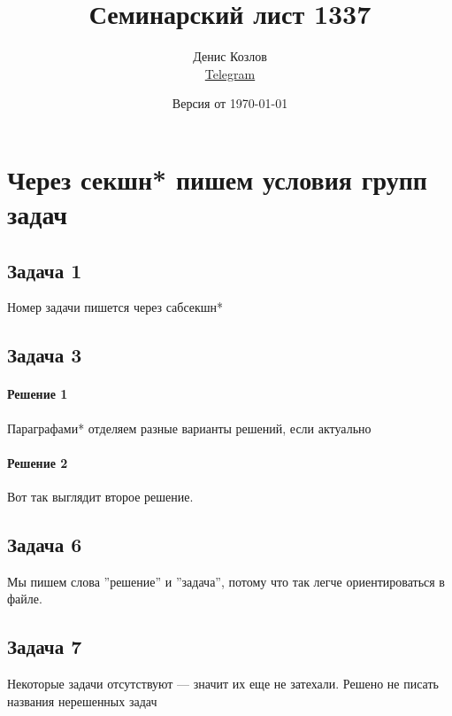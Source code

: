 \documentclass[a4paper, fleqn]{article}
\title{Семинарский лист 1337}
\author{
    Денис Козлов       \\ \href{https://t.me/DKozl50}{Telegram}
}
\date{Версия от {\ddmmyyyydate\today} \currenttime}
\begin{document}
    \maketitle
    
    \section*{Через секшн* пишем условия групп задач}
    
    \subsection*{Задача 1}
    Номер задачи пишется через сабсекшн*
    
    
    \subsection*{Задача 3}
    \paragraph*{Решение 1} 
    Параграфами* отделяем разные варианты решений, если актуально
    
    \paragraph*{Решение 2}
    Вот так выглядит второе решение.
    
    
    
    \subsection*{Задача 6}
    Мы пишем слова ''решение'' и ''задача'', потому что так легче ориентироваться в файле.
    
    \subsection*{Задача 7}
    Некоторые задачи отсутствуют — значит их еще не затехали. Решено не писать названия нерешенных задач
    
\end{document}

